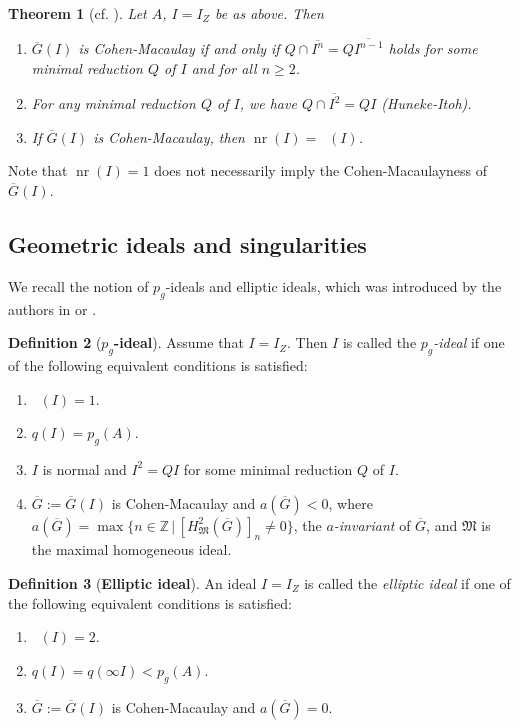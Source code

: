 \documentclass[12pt]{amsart}
\newtheorem{thm}{Theorem}[section]
\theoremstyle{definition}
\newtheorem{defn}[thm]{Definition}
\theoremstyle{remark}
\numberwithin{equation}{section}
\DeclareMathOperator{\nr}{nr}
\DeclareMathOperator{\br}{\bar r}
\newcommand{\MM}{\mathfrak M}
\newcommand{\bbZ}{\ensuremath{\mathbb Z}}
\renewcommand{\:}{\colon}
\begin{document}
\begin{thm}[\textrm{cf. \cite{HuMa, VV}}] \label{Ideal-GCM}
Let $A$, $I=I_Z$ be as above. 
Then 
\begin{enumerate}
\item $\overline{G}(I)$ is Cohen-Macaulay if and only if $Q \cap \overline{I^n} =Q\overline{I^{n-1}}$ holds for some minimal reduction $Q$ of $I$ and for all $n \ge 2$. 
\item For any minimal reduction $Q$ of $I$, we have $Q \cap \overline{I^2}=QI$ (Huneke-Itoh). 
\item If $\overline{G}(I)$ is Cohen-Macaulay, then $\nr(I)=\br(I)$. 
\end{enumerate}
\end{thm}

\par \vspace{2mm}
Note that $\nr(I)=1$ does not necessarily imply 
the Cohen-Macaulayness of $\overline{G}(I)$. 
% 
\par \vspace{2mm}
\subsection{Geometric ideals and singularities}
We recall the notion of $p_g$-ideals and elliptic ideals,  
which was introduced by the 
authors in \cite{OWY1} or \cite[Theorem 3.2]{ORWY}.  

\begin{defn}[\textbf{$p_g$-ideal}] \label{def:pgideal}
Assume that $I = I_Z$. 
Then $I$ is called the \textit{$p_g$-ideal} if one of the following equivalent conditions is satisfied: 
\begin{enumerate}
\item $\br(I)=1$. 
\item $q(I)=p_g(A)$. 
\item $I$ is normal and $I^2=QI$ for some 
minimal reduction $Q$ of $I$. 
\item $\overline{G}:=\overline{G}(I)$ is Cohen-Macaulay and $a(\overline{G})<0$, where
 $a(\overline{G})=\max\{n \in \bbZ \,|\, [H^{2}_{\MM}(\overline{G})]_n \ne 0\}$, the \textit{$a$-invariant} 
of $\overline{G}$, and  $\MM$ is the maximal homogeneous ideal.
\end{enumerate}
\end{defn}

\begin{defn}[\textbf{Elliptic ideal}] \label{def:elliptic} 
An ideal $I=I_Z$ is called the \textit{elliptic ideal}
if one of the following equivalent conditions is satisfied: 
\begin{enumerate}
\item $\br(I)=2$. 
\item $q(I) =q(\infty I) < p_g(A)$.
\item $\overline{G}:=\overline{G}(I)$ is Cohen-Macaulay and $a(\overline{G})=0$. 
\end{enumerate}
\end{defn}
\end{document}
